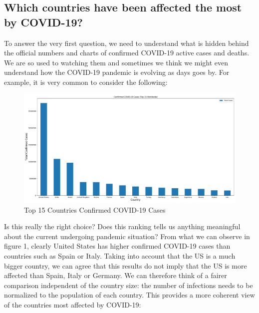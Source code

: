 \documentclass[11pt,a4paper]{article}
\begin{document}
\subsection{Which countries have been affected the most by COVID-19?}
To answer the very first question, we need to understand what is hidden behind
the official numbers and charts of confirmed COVID-19 active cases and deaths.
We are so used to watching them and sometimes we think we might even understand
how the COVID-19 pandemic is evolving as days goes by. For example, it is very
common to consider the following:
\begin{figure}[H]
    \begin{center}
        \hspace*{-0.2cm}
        \includegraphics[scale=0.32]{img/total-cases.pdf}
    \end{center}
    \caption{Top 15 Countries Confirmed COVID-19 Cases}
\end{figure}
\noindent Is this really the right choice? Does this ranking tells us anything
meaningful about the current undergoing pandemic situation? From what we can
observe in figure 1, clearly United States has higher confirmed COVID-19 cases
than countries such as Spain or Italy. Taking into account that the US is a much
bigger country, we can agree that this results do not imply that the US is more
affected than Spain, Italy or Germany. We can therefore think of a fairer
comparison independent of the country size: the number of infections needs to be
normalized to the population of each country. This provides a more coherent view
of the countries most affected by COVID-19:
\end{document}
